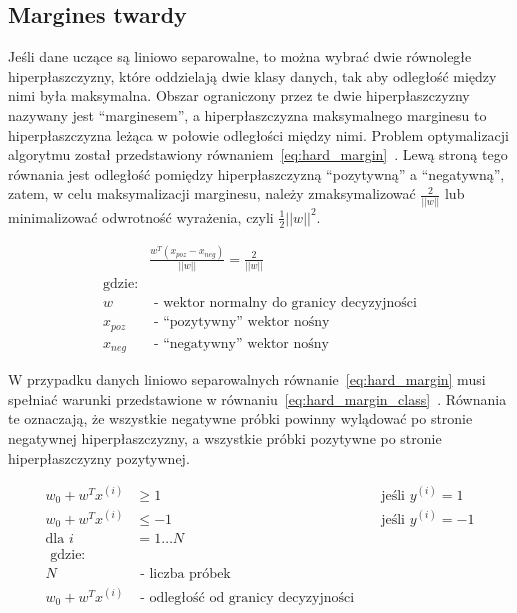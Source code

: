 \pagebreak

\subsection{Margines twardy}

Jeśli dane uczące są liniowo separowalne, to można wybrać dwie równoległe hiperpłaszczyzny,
które oddzielają dwie klasy danych, tak aby odległość między nimi była maksymalna.
Obszar ograniczony przez te dwie hiperpłaszczyzny nazywany jest ``marginesem'',
a hiperpłaszczyzna maksymalnego marginesu to hiperpłaszczyzna leżąca w połowie odległości między nimi.
Problem optymalizacji algorytmu został przedstawiony równaniem~\ref{eq:hard_margin}~\cite{raschka2017python}.
Lewą stroną tego równania jest odległość pomiędzy hiperpłaszczyzną ``pozytywną'' a ``negatywną'',
zatem, w celu maksymalizacji marginesu, należy zmaksymalizować $\frac{2}{||w||}$ lub
minimalizować odwrotność wyrażenia, czyli $\frac{1}{2}||w||^2$.

\begin{equation}
    \begin{aligned}
        & \frac{ w^T (x_{poz} - x_{neg}) }{ ||w|| } = \frac{2}{||w||} \\
        \text{gdzie:} \\
        w & \text{ - wektor normalny do granicy decyzyjności}
        \\
        x_{poz} & \text{ - ``pozytywny'' wektor nośny}
        \\
        x_{neg} & \text{ - ``negatywny'' wektor nośny}
    \end{aligned}
    \label{eq:hard_margin}
\end{equation}
\bigskip

W przypadku danych liniowo separowalnych równanie~\ref{eq:hard_margin} musi
spełniać warunki przedstawione w równaniu~\ref{eq:hard_margin_class}~\cite{raschka2017python}.
Równania te oznaczają, że wszystkie negatywne próbki powinny wylądować po stronie
negatywnej hiperpłaszczyzny, a wszystkie próbki pozytywne po stronie hiperpłaszczyzny pozytywnej.

\begin{equation}
    \begin{aligned}
        w_0 +w^{T}x^{(i)} &\geq 1 && \text{ jeśli } y^{(i)} =1
        \\
        w_0 +w^{T}x^{(i)} &\leq -1 && \text{ jeśli } y^{(i)} =-1
        \\
        \text{dla } i&= 1\dots N
        \\
        \text{ gdzie: } \\
        N & \text{  - liczba próbek}
        \\
        w_0 +w^{T}x^{(i)} & \text{  - odległość od granicy decyzyjności}
    \end{aligned}
    \label{eq:hard_margin_class}
\end{equation}

